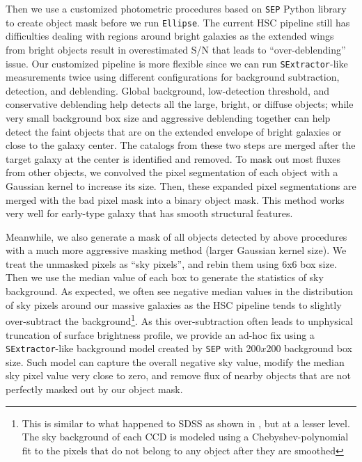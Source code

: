\documentclass[preprint]{aastex}
\begin{document}
\begin{CJK*}{UTF8}{gbsn}
    Then we use a customized photometric procedures based on \texttt{SEP} Python library
    to create object mask before we run \texttt{Ellipse}.  
    The current HSC pipeline still has difficulties dealing with regions around bright 
    galaxies as the extended wings from bright objects result in overestimated S/N that
    leads to ``over-deblending'' issue.  
    Our customized pipeline is more flexible since we can run \texttt{SExtractor}-like
    measurements twice using different configurations for background subtraction, 
    detection, and deblending.  
    Global background, low-detection threshold, and conservative deblending help detects
    all the large, bright, or diffuse objects; while very small background box size and 
    aggressive deblending together can help detect the faint objects that are on the 
    extended envelope of bright galaxies or close to the galaxy center.  
    The catalogs from these two steps are merged after the target galaxy at the center 
    is identified and removed. 
    To mask out most fluxes from other objects, we convolved the pixel segmentation of 
    each object with a Gaussian kernel to increase its size.  
    Then, these expanded pixel segmentations are merged with the bad pixel mask into a 
    binary object mask.  
    This method works very well for early-type galaxy that has smooth structural 
    features.  
    
    Meanwhile, we also generate a mask of all objects detected by above procedures with 
    a much more aggressive masking method (larger Gaussian kernel size).  
    We treat the unmasked pixels as ``sky pixels'', and rebin them using 6x6 box size.
    Then we use the median value of each box to generate the statistics of sky background.
    As expected, we often see negative median values in the distribution of sky pixels 
    around our massive galaxies as the HSC pipeline tends to slightly over-subtract 
    the background\footnote{This is similar to what happened to SDSS as shown in 
    \citealt{Blanton2011}, but at a lesser level.  The sky background of each CCD 
    is modeled using a Chebyshev-polynomial fit to the pixels that do not belong to 
    any object after they are smoothed}. 
    As this over-subtraction often leads to unphysical truncation of surface brightness 
    profile, we provide an ad-hoc fix using a \texttt{SExtractor}-like background model 
    created by \texttt{SEP} with 200$x$200 background box size.  
    Such model can capture the overall negative sky value, modify the median sky pixel 
    value very close to zero, and remove flux of nearby objects that are not perfectly 
    masked out by our object mask.     
        

\end{CJK*}
\end{document}
